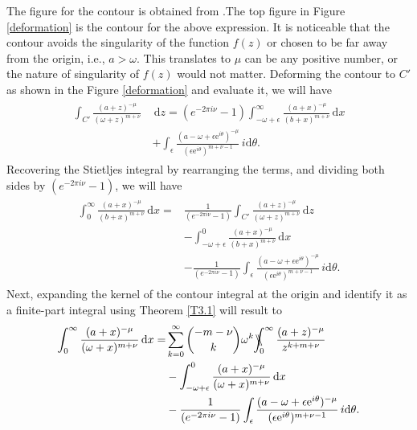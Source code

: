 The figure for the contour is obtained from \cite{doi:10.1063/5.0038274}.The top figure in Figure \ref{deformation} is the contour for the above expression. It is noticeable that the contour avoids the singularity of the function $f(z)$ or chosen to be far away from the origin, i.e., $a > \omega$. This translates to $\mu$ can be any positive number, or the nature of singularity of $f(z)$ would not matter. Deforming the contour to $C'$ as shown in the Figure \ref{deformation} and evaluate it, we will have
\begin{align}
\begin{split}
    \int_{C'} \frac{(a+z)^{-\mu}}{(\omega+z)^{m+\nu}}\,& \,\mathrm{d}z 
    = \left( e^{-2\pi i \nu}-1 \right) \int_{-\omega+\epsilon}^{\infty} \frac{ (a+x)^{-\mu}}{(b+x)^{m+\nu}} \, \mathrm{d}x 
    \\& + \int_{\epsilon} \frac{(a-\omega+\epsilon \mathrm{e}^{i\theta})^{-\mu}}{(\epsilon \mathrm{e}^{i\theta})^{m+\nu-1}}\, i \mathrm{d}\theta.
\end{split}
\end{align}
Recovering the Stietljes integral by rearranging the terms, and dividing both sides by $\left( e^{-2\pi i \nu}-1 \right)$, we will have
\begin{align}
\begin{split}
    \int_{0}^{\infty} \frac{ (a+x)^{-\mu}}{(b+x)^{m+\nu}} \, \mathrm{d}x  =  & \frac{1}{\left( e^{-2\pi i \nu}-1 \right)} \int_{C'} \frac{(a+z)^{-\mu}}{(\omega+z)^{m+\nu}} \,\mathrm{d}z \\& - \int_{-\omega+\epsilon}^{0} \frac{ (a+x)^{-\mu}}{(b+x)^{m+\nu}} \, \mathrm{d}x \\&  - \frac{1}{\left( e^{-2\pi i \nu}-1 \right)} \int_{\epsilon} \frac{(a-\omega+\epsilon \mathrm{e}^{i\theta})^{-\mu}}{(\epsilon \mathrm{e}^{i\theta})^{m+\nu-1}}\, i \mathrm{d}\theta.
\end{split}
\end{align}
Next, expanding the kernel of the contour integral at the origin and identify it as a finite-part integral using Theorem \ref{T3.1} will result to 
\begin{align}
\begin{split}
    \int_{0}^{\infty} \frac{ (a+x)^{-\mu}}{(\omega+x)^{m+\nu}} \, \mathrm{d}x  =  & \sum_{k=0}^{\infty} \binom{-m-\nu}{k} \omega^{k} \bbint{0}{\infty} \frac{(a+z)^{-\mu}}{z^{k+m+\nu}} \\& - \int_{-\omega+\epsilon}^{0} \frac{ (a+x)^{-\mu}}{(\omega+x)^{m+\nu}} \, \mathrm{d}x \\&  - \frac{1}{\left( e^{-2\pi i \nu}-1 \right)} \int_{\epsilon} \frac{(a-\omega+\epsilon \mathrm{e}^{i\theta})^{-\mu}}{(\epsilon \mathrm{e}^{i\theta})^{m+\nu-1}}\, i \mathrm{d}\theta.
\end{split}
\end{align}
